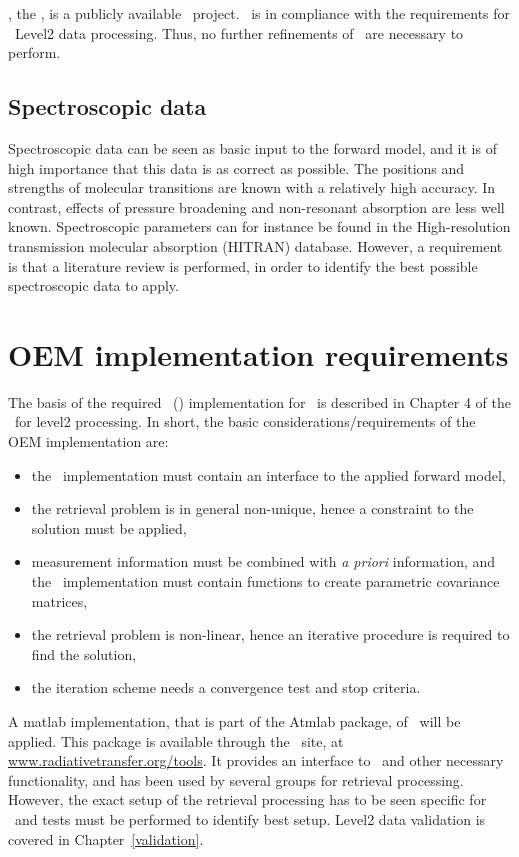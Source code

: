 \ARTS, the \ARTSlong,
is a publicly available \FOSSlong\ project.
\ARTS\ is in compliance with the requirements for \smr\ Level2
data processing. Thus, no further refinements of \ARTS\ are necessary to perform.

\subsection{Spectroscopic data}

Spectroscopic data can be seen as basic input to the forward model,  
and it is of high importance that this data is as correct as possible. 
The positions and strengths of molecular transitions
are known with a relatively high accuracy. In contrast, effects of pressure
broadening and non-resonant absorption are less well known.
Spectroscopic parameters can for instance be found in the 
High-resolution transmission molecular absorption (HITRAN) database.
However, a requirement is that a literature review is performed,
in order to identify the best possible spectroscopic data to apply. 


\section{OEM implementation requirements}

The basis of the required \OEM\ (\OEMlong) implementation for \smr\ 
is described in Chapter 4 of the \ATBD\ for level2 processing.
In short, the basic considerations/requirements of the OEM implementation are:
\begin{itemize}
\item the \OEM\ implementation must contain an interface to
      the applied forward model,
\item the retrieval problem is in general non-unique, hence
      a constraint to the solution must be applied,
\item measurement information must be combined with \textit{a priori}
      information, and the \OEM\ implementation must contain functions to 
      create parametric covariance matrices,
\item the retrieval problem is non-linear, hence an iterative
      procedure is required to find the solution,
\item the iteration scheme needs a convergence test and stop 
      criteria.
\end{itemize}

A matlab implementation, that is part of the Atmlab package, 
of \OEM\ will be applied. This package is available through the \ARTS\ site,
at \url{www.radiativetransfer.org/tools}. It provides an interface
to \ARTS\ and other necessary functionality, and has
been used by several groups for retrieval processing.
However, the exact setup of the retrieval processing
has to be seen specific for \smr\ and tests must be performed
to identify best setup. Level2 data validation 
is covered in Chapter~\ref{validation}.



